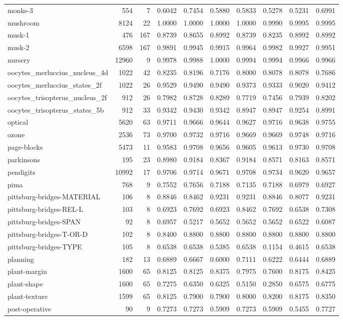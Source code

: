 \documentclass{article}
\begin{document}
\begin{table}
\begin{tabular}{lrrlllllll}
monks-3 & 554 & 7 & 0.6042 & 0.7454 & 0.5880 & 0.5833 & 0.5278 & 0.5231 & 0.6991\tabularnewline
mushroom & 8124 & 22 & 1.0000 & 1.0000 & 1.0000 & 1.0000 & 0.9990 & 0.9995 & 0.9995\tabularnewline
musk-1 & 476 & 167 & 0.8739 & 0.8655 & 0.8992 & 0.8739 & 0.8235 & 0.8992 & 0.8992\tabularnewline
musk-2 & 6598 & 167 & 0.9891 & 0.9945 & 0.9915 & 0.9964 & 0.9982 & 0.9927 & 0.9951\tabularnewline
nursery & 12960 & 9 & 0.9978 & 0.9988 & 1.0000 & 0.9994 & 0.9994 & 0.9966 & 0.9966\tabularnewline
oocytes\_merluccius\_nucleus\_4d & 1022 & 42 & 0.8235 & 0.8196 & 0.7176 & 0.8000 & 0.8078 & 0.8078 & 0.7686\tabularnewline
oocytes\_merluccius\_states\_2f & 1022 & 26 & 0.9529 & 0.9490 & 0.9490 & 0.9373 & 0.9333 & 0.9020 & 0.9412\tabularnewline
oocytes\_trisopterus\_nucleus\_2f & 912 & 26 & 0.7982 & 0.8728 & 0.8289 & 0.7719 & 0.7456 & 0.7939 & 0.8202\tabularnewline
oocytes\_trisopterus\_states\_5b & 912 & 33 & 0.9342 & 0.9430 & 0.9342 & 0.8947 & 0.8947 & 0.9254 & 0.8991\tabularnewline
optical & 5620 & 63 & 0.9711 & 0.9666 & 0.9644 & 0.9627 & 0.9716 & 0.9638 & 0.9755\tabularnewline
ozone & 2536 & 73 & 0.9700 & 0.9732 & 0.9716 & 0.9669 & 0.9669 & 0.9748 & 0.9716\tabularnewline
page-blocks & 5473 & 11 & 0.9583 & 0.9708 & 0.9656 & 0.9605 & 0.9613 & 0.9730 & 0.9708\tabularnewline
parkinsons & 195 & 23 & 0.8980 & 0.9184 & 0.8367 & 0.9184 & 0.8571 & 0.8163 & 0.8571\tabularnewline
pendigits & 10992 & 17 & 0.9706 & 0.9714 & 0.9671 & 0.9708 & 0.9734 & 0.9620 & 0.9657\tabularnewline
pima & 768 & 9 & 0.7552 & 0.7656 & 0.7188 & 0.7135 & 0.7188 & 0.6979 & 0.6927\tabularnewline
pittsburg-bridges-MATERIAL & 106 & 8 & 0.8846 & 0.8462 & 0.9231 & 0.9231 & 0.8846 & 0.8077 & 0.9231\tabularnewline
pittsburg-bridges-REL-L & 103 & 8 & 0.6923 & 0.7692 & 0.6923 & 0.8462 & 0.7692 & 0.6538 & 0.7308\tabularnewline
pittsburg-bridges-SPAN & 92 & 8 & 0.6957 & 0.5217 & 0.5652 & 0.5652 & 0.5652 & 0.6522 & 0.6087\tabularnewline
pittsburg-bridges-T-OR-D & 102 & 8 & 0.8400 & 0.8800 & 0.8800 & 0.8800 & 0.8800 & 0.8800 & 0.8800\tabularnewline
pittsburg-bridges-TYPE & 105 & 8 & 0.6538 & 0.6538 & 0.5385 & 0.6538 & 0.1154 & 0.4615 & 0.6538\tabularnewline
planning & 182 & 13 & 0.6889 & 0.6667 & 0.6000 & 0.7111 & 0.6222 & 0.6444 & 0.6889\tabularnewline
plant-margin & 1600 & 65 & 0.8125 & 0.8125 & 0.8375 & 0.7975 & 0.7600 & 0.8175 & 0.8425\tabularnewline
plant-shape & 1600 & 65 & 0.7275 & 0.6350 & 0.6325 & 0.5150 & 0.2850 & 0.6575 & 0.6775\tabularnewline
plant-texture & 1599 & 65 & 0.8125 & 0.7900 & 0.7900 & 0.8000 & 0.8200 & 0.8175 & 0.8350\tabularnewline
post-operative & 90 & 9 & 0.7273 & 0.7273 & 0.5909 & 0.7273 & 0.5909 & 0.5455 & 0.7727\tabularnewline

\end{tabular}
\end{table}
\end{document}
